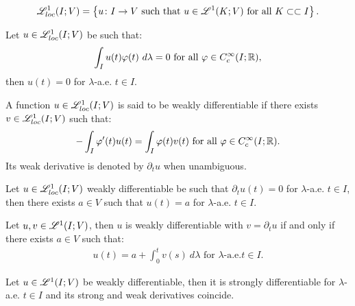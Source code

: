 \begin{definition}
    \begin{gather}
        \mathscr{L}^{1}_{loc}(I; V) = \left\{ u\colon I \rightarrow V  \text{ such that } u \in \mathscr{L}^{1}(K; V) \text{ for all } K \subset \subset I \right\}.
    \end{gather}
\end{definition}

\begin{corollary}
    Let $u \in \mathscr{L}^{1}_{loc}(I; V)$ be such that:
    \begin{gather}
        \int_I u(t) \varphi(t) ~ d \lambda = 0 \text{ for all } \varphi \in C_c^{\infty}(I; \mathbb{R}),
    \end{gather}
    then $u(t) = 0$ for $\lambda$-a.e. $t \in I$.
\end{corollary}

\begin{definition}
    A function $u \in \mathscr{L}^{1}_{loc}(I; V)$ is said to be weakly differentiable if there exists $v \in \mathscr{L}^{1}_{loc}(I; V)$ such that:
    \begin{gather}
        - \int_I \varphi^{\prime}(t) u(t) = \int_I \varphi(t) v(t) \text{ for all } \varphi \in C_c^{\infty}(I; \mathbb{R}).
    \end{gather}
    Its weak derivative is denoted by $\partial_t u$ when unambiguous.
\end{definition}

\begin{lemma}
    Let $u \in \mathscr{L}^{1}_{loc}(I; V)$ weakly differentiable be such that $\partial_t u(t) = 0$ for $\lambda$-a.e. $t \in I$, then there exists $a \in V$ such that $u(t) = a$ for $\lambda$-a.e. $t \in I$.
\end{lemma}

\begin{theorem}
    Let $u, v \in \mathscr{L}^{1}(I; V)$, then $u$ is weakly differentiable with $v = \partial_t u$ if and only if there exists $a \in V$ such that:
    \begin{gather}
        u(t) = a + \int_0^t v(s) ~ d \lambda \text{ for } \lambda \text{-a.e.} t \in I.
    \end{gather}
\end{theorem}

\begin{corollary}
    Let $u \in \mathscr{L}^{1}(I; V)$ be weakly differentiable, then it is strongly differentiable for $\lambda$-a.e. $t \in I$ and its strong and weak derivatives coincide.
\end{corollary}

